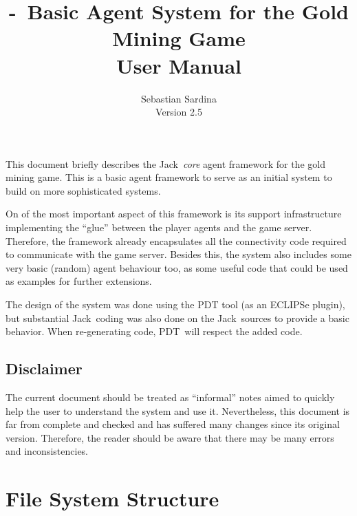 \documentclass[10pt]{article}
\title{\textbf{\PDT-\JACK\ Basic Agent System for the Gold Mining Game} \\
User Manual}
\author{Sebastian Sardina \\ Version 2.5}
\newcommand{\propername}[1]{\mbox{\sf #1}\xspace}
\newcommand{\JACK}{\propername{Jack}}
\newcommand{\PDT}{\propername{PDT}}
\newcommand{\ECLIPSE}{\propername{ECLIPSe}}
\begin{document}
\maketitle               %



This document briefly describes the \JACK\ \textit{core} agent framework for the gold mining game. This is a basic agent framework to serve as an initial system to build on more sophisticated systems.

On of the most important aspect of this framework is its support infrastructure implementing the ``glue'' between the player agents and the game server. Therefore, the framework already encapsulates all the connectivity code required to communicate with the game server.
%
Besides this, the system also includes some very basic (random) agent behaviour too, as some useful code that could be used as examples for further extensions.

The design of the system was done using the \PDT tool (as an \ECLIPSE plugin), but substantial \JACK\ coding was also done on the \JACK\ sources to provide a basic behavior. When re-generating code, \PDT\ will respect the added code.



\subsection*{Disclaimer}

The current document should be treated as ``informal'' notes aimed to quickly help the user to understand the system and use it. Nevertheless, this document is far from complete and checked and has suffered many changes since its original version. Therefore, the reader should be aware that there may be many errors and inconsistencies.


\section{File System Structure}
\end{document}
